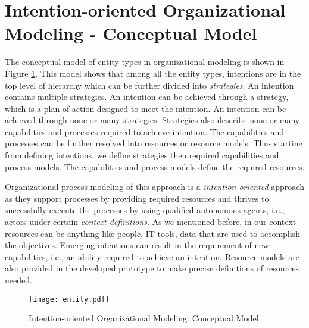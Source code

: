 \section{Intention-oriented Organizational Modeling - Conceptual Model}
\label{sec:entitytypesrepresentation}
The conceptual model of entity types in organizational modeling is shown in Figure \ref{fig:entitymodel}. This model shows that among all the entity types, intentions are in the top level of hierarchy which can be further divided into \textit{strategies}. An intention contains multiple strategies. An intention can be achieved through a strategy, which is a plan of action designed to meet the intention. An intention can be achieved through none or many strategies. Strategies also describe none or many capabilities and processes required to achieve intention. The capabilities and processes can be further resolved into resources or resource models. Thus starting from defining intentions, we define strategies then required capabilities and process models. The capabilities and process models define the required resources. 

Organizational process modeling of this approach is a \textit{intention-oriented} approach as they support processes by providing required resources and thrives to successfully execute the processes by using qualified autonomous agents, i.e., actors under certain \textit{context definitions}.  As we mentioned before, in our context resources can be anything like people, IT tools, data that are used to accomplish the objectives. Emerging intentions can result in the requirement of new capabilities, i.e., an ability required to achieve an intention. Resource models are also provided in the developed prototype to make precise definitions of resources needed.

\begin{figure}
	\centering
	\texttt{[image: entity.pdf]}
	\caption{Intention-oriented Organizational Modeling: Conceptual Model}
	\label{fig:entitymodel}
\end{figure}

